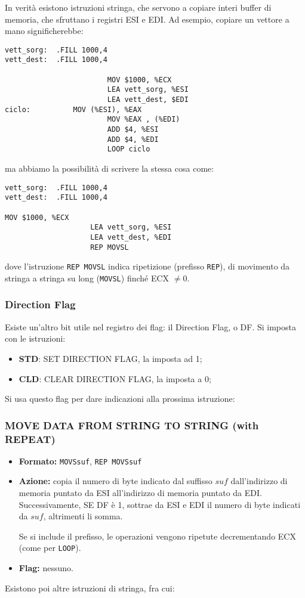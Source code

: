 \documentclass[a4paper,11pt]{article}
\begin{document}
In verità esistono istruzioni stringa, che servono a copiare interi buffer di memoria, che sfruttano i registri ESI e EDI.
Ad esempio, copiare un vettore a mano significherebbe:
\begin{lstlisting}	
vett_sorg:	.FILL 1000,4
vett_dest:	.FILL 1000,4

						MOV $1000, %ECX
						LEA vett_sorg, %ESI
						LEA vett_dest, $EDI
ciclo:			MOV (%ESI), %EAX
						MOV %EAX , (%EDI)
						ADD $4, %ESI
						ADD $4, %EDI
						LOOP ciclo
\end{lstlisting}
ma abbiamo la possibilità di scrivere la stessa cosa come:
\begin{lstlisting}	
vett_sorg:	.FILL 1000,4
vett_dest:	.FILL 1000,4

MOV $1000, %ECX
					LEA vett_sorg, %ESI
					LEA vett_dest, %EDI
					REP MOVSL
\end{lstlisting}
dove l'istruzione \lstinline|REP MOVSL| indica ripetizione (prefisso \lstinline|REP|), di movimento da stringa a stringa su long (\lstinline|MOVSL|) finché ECX $\neq 0$.

\subsubsection{Direction Flag}
Esiste un'altro bit utile nel registro dei flag: il Direction Flag, o DF.
Si imposta con le istruzioni:
\begin{itemize}
	\item \textbf{\textsf{STD}}: \textsf{SET DIRECTION FLAG}, la imposta ad 1;
	\item \textbf{\textsf{CLD}}: \textsf{CLEAR DIRECTION FLAG}, la imposta a  0;
\end{itemize}

Si usa questo flag per dare indicazioni alla prossima istruzione:

\subsubsection{MOVE DATA FROM STRING TO STRING (with REPEAT)}
\begin{itemize}
	\item \textbf{Formato:} \lstinline|MOVSsuf|, \lstinline|REP MOVSsuf| 
	\item \textbf{Azione:} copia il numero di byte indicato dal suffisso $suf$ dall'indirizzo di memoria puntato da ESI all'indirizzo di memoria puntato da EDI.
		Successivamente, SE DF è 1, sottrae da ESI e EDI il numero di byte indicati da $suf$, altrimenti li somma.

		Se si include il prefisso, le operazioni vengono ripetute decrementando ECX (come per \lstinline|LOOP|).
	\item \textbf{Flag:} nessuno.
\end{itemize}
\par\medskip
Esistono poi altre istruzioni di stringa, fra cui:
\end{document}
